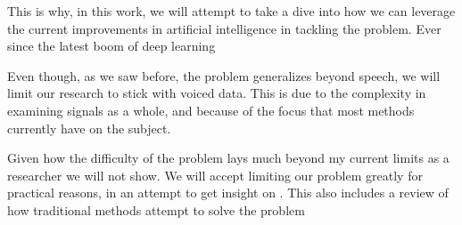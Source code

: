 \documentclass{article}
\begin{document}
\par
This is why, in this work, we will attempt to take a dive into how we can leverage the current improvements in artificial intelligence in tackling the problem. Ever since the latest boom of deep learning \cite{DeepLearning}
\par
Even though, as we saw before, the problem generalizes beyond speech, we will limit our research to stick with voiced data. This is due to the complexity in examining signals as a whole, and because of the focus that most methods currently have on the subject.
\par
Given how the difficulty of the problem lays much beyond my current limits as a researcher we will not show. We will accept limiting our problem greatly for practical reasons, in an attempt to get insight on . This also includes a review of how traditional methods attempt to solve the problem



\end{document}
